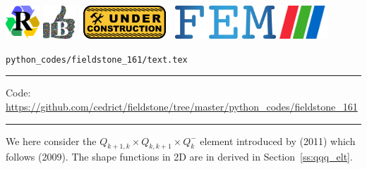 \noindent
\includegraphics[height=1.25cm]{images/pictograms/replication}
\includegraphics[height=1.25cm]{images/pictograms/benchmark}
\includegraphics[height=1.25cm]{images/pictograms/under_construction}
\includegraphics[height=1.25cm]{images/pictograms/FEM}
\includegraphics[height=1.25cm]{images/pictograms/paraview}


\begin{flushright} {\tiny {\color{gray} \tt python\_codes/fieldstone\_161/text.tex}} \end{flushright}

%

\par\noindent\rule{\textwidth}{0.4pt}

\begin{center}
\inpython
{\small Code: \url{https://github.com/cedrict/fieldstone/tree/master/python_codes/fieldstone_161}}
\end{center}

\par\noindent\rule{\textwidth}{0.4pt}


We here consider the $Q_{k+1,k}\times Q_{k,k+1} \times Q_{k}^-$ element introduced 
by \textcite{huzh11} (2011) which follows \textcite{zhan09} (2009).
The shape functions in 2D are in derived in Section~\ref{ss:qqq_elt}. 

